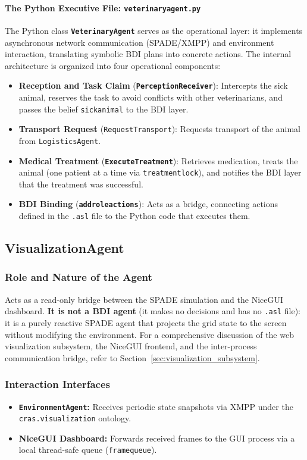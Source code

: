 \documentclass{article}
\renewcommand{\_}{\oldtextunderscore\allowbreak}
\begin{document}
\paragraph{The Python Executive File: \texttt{veterinary\_agent.py}}
The Python class \textbf{\texttt{VeterinaryAgent}} serves as the operational layer: it implements asynchronous network communication (SPADE/XMPP) and environment interaction, translating symbolic BDI plans into concrete actions.
The internal architecture is organized into four operational components:
\begin{itemize}
    \item \textbf{Reception and Task Claim} (\textbf{\texttt{PerceptionReceiver}}): Intercepts the sick animal, reserves the task to avoid conflicts with other veterinarians, and passes the belief \texttt{sick\_animal} to the BDI layer.
    \item \textbf{Transport Request} (\texttt{RequestTransport}): Requests transport of the animal from \texttt{LogisticsAgent}.
    \item \textbf{Medical Treatment} (\textbf{\texttt{ExecuteTreatment}}): Retrieves medication, treats the animal (one patient at a time via \texttt{treatment\_lock}), and notifies the BDI layer that the treatment was successful.
    \item \textbf{BDI Binding} (\textbf{\texttt{add\_role\_actions}}): Acts as a bridge, connecting actions defined in the \texttt{.asl} file to the Python code that executes them.
\end{itemize}

\subsection{VisualizationAgent}\label{subsec:visualization_agent}
\subsubsection{Role and Nature of the Agent}
Acts as a read-only bridge between the SPADE simulation and the NiceGUI dashboard. \textbf{It is not a BDI agent} (it makes no decisions and has no \texttt{.asl} file): it is a purely reactive SPADE agent that projects the grid state to the screen without modifying the environment. For a comprehensive discussion of the web visualization subsystem, the NiceGUI frontend, and the inter-process communication bridge, refer to Section~\ref{sec:visualization_subsystem}.
\subsubsection{Interaction Interfaces}
\begin{itemize}
    \item \textbf{\texttt{EnvironmentAgent}:} Receives periodic state snapshots via XMPP under the \texttt{cras.visualization} ontology.
    \item \textbf{NiceGUI Dashboard:} Forwards received frames to the GUI process via a local thread-safe queue (\texttt{frame\_queue}).
\end{itemize}
\end{document}

